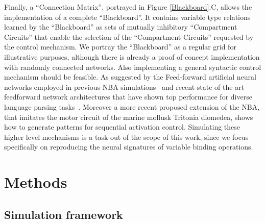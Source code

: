 \documentclass[10pt]{article}
\begin{document}
Finally, a ``Connection Matrix'', portrayed in Figure {\ref{Blackboard}}.C, allows the implementation of a complete ``Blackboard''.
It contains variable type relations learned by the ``Blackboard'' as sets of mutually inhibitory ``Compartment Circuits'' that enable the selection of the ``Compartment Circuits'' requested by the control mechanism.
We portray the ``Blackboard'' as a regular grid for illustrative purposes, although there is already a proof of concept implementation with randomly connected networks\cite{van_der_Velde_2011}.
Also implementing a general syntactic control mechanism should be feasible.
As suggested by the Feed-forward artificial neural networks employed in previous NBA simulations~\cite{van_der_Velde_2010} and recent state of the art feedforward network architectures that have shown top performance for diverse language parsing tasks~\cite{andor2016globally}.
Moreover a more recent proposed extension of the NBA, that imitates the motor circuit of the marine mollusk Tritonia diomedea, shows how to generate patterns for sequential activation control\cite{van_Dijk_2015}.
Simulating these higher level mechanisms is a task out of the scope of this work, since we focus specifically on reproducing the neural signatures of variable binding operations.


\section{Methods}

{\label{488128}}

\subsection{Simulation framework}\label{simulation-framework}
\end{document}

